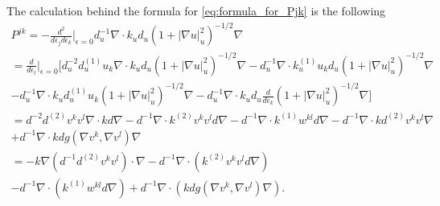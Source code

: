 \documentclass[12pt]{amsart}
\theoremstyle{definition}
\theoremstyle{remark}
\newcommand{\abs}[1]{\lvert #1 \rvert}
\newcommand{\eps}{\epsilon}
\begin{document}
The calculation behind the formula for \eqref{eq:formula_for_Pjk} is the following
\begin{multline*}
 P^{jk}
 =-\frac{d^2}{d\eps_jd\eps_k}\Big|_{\eps=0}d_u^{-1}\nabla\cdot k_ud_u(1+\abs{\nabla u}^2_u)^{-1/2}\nabla  \\
 =\frac{d}{d\eps_l}\Big|_{\eps=0}\Big[d^{-2}_u d^{(1)}_u u_k\nabla\cdot k_ud_u (1+\abs{\nabla u}^2_u)^{-1/2} \nabla-d^{-1}_u\nabla\cdot k_u^{(1)}u_kd_u (1+\abs{\nabla u}^2_u)^{-1/2} \nabla\\
 -d^{-1}_u\nabla\cdot k_u d_u^{(1)}u_k (1+\abs{\nabla u}^2_u)^{-1/2} \nabla -d^{-1}_u\nabla\cdot k_u d_u \frac{d}{d\eps_k}(1+\abs{\nabla u}^2_u)^{-1/2} \nabla\Big]  \\
 =d^{-2} d^{(2)} v^k v^l\nabla\cdot kd \nabla-d^{-1}\nabla\cdot k^{(2)}v^kv^ld \nabla-d^{-1}\nabla\cdot k^{(1)}w^{kl}d \nabla-d^{-1}\nabla\cdot k d^{(2)}v^kv^l
 \nabla  \\
 +d^{-1}\nabla\cdot kd g(\nabla v^k,\nabla v^l)\nabla \\
 =-k\nabla (d^{-1}d^{(2)}v^k v^l)\cdot \nabla-d^{-1}\nabla\cdot (k^{(2)}v^kv^ld \nabla) \\
 -d^{-1}\nabla\cdot (k^{(1)}w^{kl}d \nabla)
 +d^{-1}\nabla\cdot (kd g(\nabla v^k,\nabla v^l)\nabla).
\end{multline*}
\end{document}
